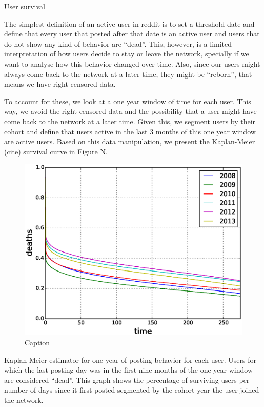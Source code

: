 User survival

The simplest definition of an active user in reddit is to set a threshold date and define that every user that posted after that date is an active user and users that do not show any kind of behavior are ``dead''. This, however, is a limited interpretation of how users decide to stay or leave the network, specially if we want to analyse how this behavior changed over time. Also, since our users might always come back to the network at a later time, they might be ``reborn'', that means we have right censored data.

To account for these, we look at a one year window of time for each user. This way, we avoid the right censored data and the possibility that a user might have come back to the network at a later time. Given this, we segment users by their cohort and define that users active in the last 3 months of this one year window are active users. Based on this data manipulation, we present the Kaplan-Meier (cite) survival curve in Figure N.

\begin{figure}[!tb]
\centering
\includegraphics[scale=0.4]{./images/kaplan_meier_users.eps}
\caption{Caption}
\label{fig:kaplan_meier_users}
\end{figure}

Kaplan-Meier estimator for one year of posting behavior for each user. Users for which the last posting day was in the first nine months of the one year window are considered ``dead''. This graph shows the percentage of surviving users per number of days since it first posted segmented by the cohort year the user joined the network.

